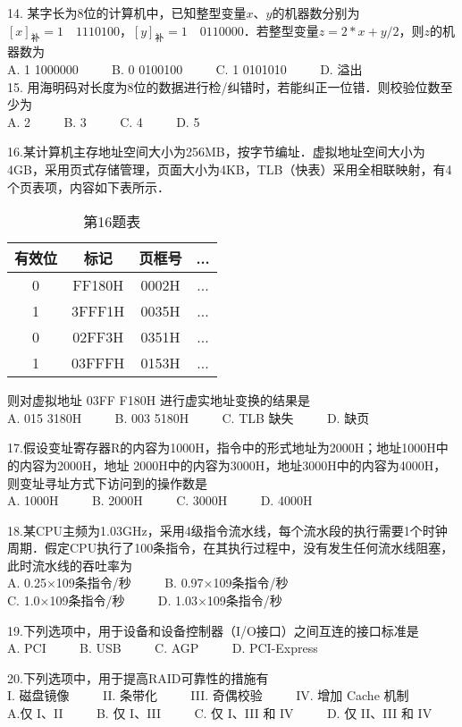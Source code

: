 14.	某字长为$8$位的计算机中，已知整型变量$x$、$y$的机器数分别为$[x]_\text{补}=1 \quad 1110100$，$[y]_\text{补}=1 \quad 0110000$．若整型变量$z=2*x+y/2$，则$z$的机器数为 \\
A. 1 1000000 $\qquad$ B. 0 0100100  $\qquad$  C. 1 0101010  $\qquad$  D. 溢出 \\

15.	用海明码对长度为$8$位的数据进行检/纠错时，若能纠正一位错．则校验位数至少为 \\ 
A. 2 $\qquad$ B. 3 $\qquad$ C. 4 $\qquad$ D. 5 

16.某计算机主存地址空间大小为256MB，按字节编址．虚拟地址空间大小为4GB，采用页式存储管理，页面大小为4KB，TLB（快表）采用全相联映射，有4个页表项，内容如下表所示．
\begin{table}[ht]
\centering
\caption{第16题表}\label{CSN13_tab2}
\begin{tabular}{|c|c|c|c|}
\hline
有效位 & 标记 & 页框号 & ... \\
\hline
0 & FF180H & 0002H & ... \\
\hline
1 & 3FFF1H & 0035H & ... \\
\hline
0 & 02FF3H & 0351H & ... \\
\hline
1 & 03FFFH & 0153H & ... \\
\hline
\end{tabular}
\end{table}
则对虚拟地址 03FF F180H 进行虚实地址变换的结果是 \\ 
A. 015 3180H $\qquad$ B. 003 5180H $\qquad$ C. TLB 缺失 $\qquad$ D. 缺页

17.假设变址寄存器R的内容为1000H，指令中的形式地址为2000H；地址1000H中的内容为2000H，地址 2000H中的内容为3000H，地址3000H中的内容为4000H，则变址寻址方式下访问到的操作数是 \\
A. 1000H $\qquad$ B. 2000H $\qquad$ C. 3000H $\qquad$ D. 4000H

18.某CPU主频为1.03GHz，采用4级指令流水线，每个流水段的执行需要1个时钟周期．假定CPU执行了100条指令，在其执行过程中，没有发生任何流水线阻塞，此时流水线的吞吐率为 \\
A. 0.25×109条指令/秒 $\qquad$ B. 0.97×109条指令/秒 \\
C. 1.0×109条指令/秒  $\qquad$ D. 1.03×109条指令/秒

19.下列选项中，用于设备和设备控制器（I/O接口）之间互连的接口标准是 \\
A. PCI  $\qquad$  B. USB  $\qquad$ C. AGP  $\qquad$  D. PCI-Express

20.下列选项中，用于提高RAID可靠性的措施有 \\
I. 磁盘镜像 $\qquad$ II. 条带化 $\qquad$ III. 奇偶校验 $\qquad$ IV. 增加 Cache 机制 \\
A.仅 I、II  $\qquad$  B. 仅 I、III  $\qquad$  C. 仅 I、III 和 IV $\qquad$ D. 仅 II、III 和 IV

